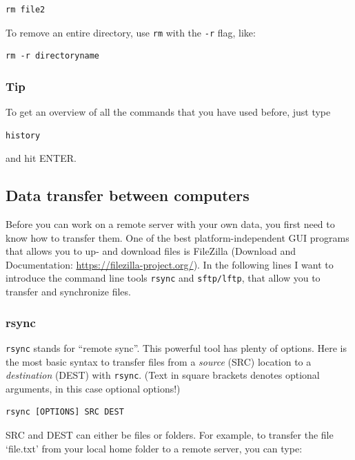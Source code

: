 \documentclass[11pt]{article}
\begin{document}
\begin{verbatim}
rm file2
\end{verbatim}

To remove an entire directory, use \texttt{rm} with the \texttt{-r} flag, like:


\begin{verbatim}
rm -r directoryname
\end{verbatim}
\subsubsection{Tip}
\label{sec-2-1-8}

To get an overview of all the commands that you have used before, just
type



\begin{verbatim}
history
\end{verbatim}

and hit ENTER.
\subsection{Data transfer between computers}
\label{sec-2-2}

Before you can work on a remote server with your own data, you first
need to know how to transfer them.  One of the best
platform-independent GUI programs that allows you to up- and download
files is FileZilla (Download and Documentation:
\href{https://filezilla-project.org/}{https://filezilla-project.org/}). In the following lines I want to
introduce the command line tools \texttt{rsync} and \texttt{sftp/lftp}, that allow
you to transfer and synchronize files.
\subsubsection{rsync}
\label{sec-2-2-1}



 \texttt{rsync} stands for ``remote sync''. This powerful tool has plenty of
 options.  Here is the most basic syntax to transfer files from a
 \emph{source} (SRC) location to a \emph{destination} (DEST) with \texttt{rsync}. (Text
 in square brackets denotes optional arguments, in this case optional
 options!)


\begin{verbatim}
rsync [OPTIONS] SRC DEST
\end{verbatim}

 SRC and DEST can either be files or folders. For example, to
 transfer the file `file.txt' from your local home folder to a remote
 server, you can type:
\end{document}
